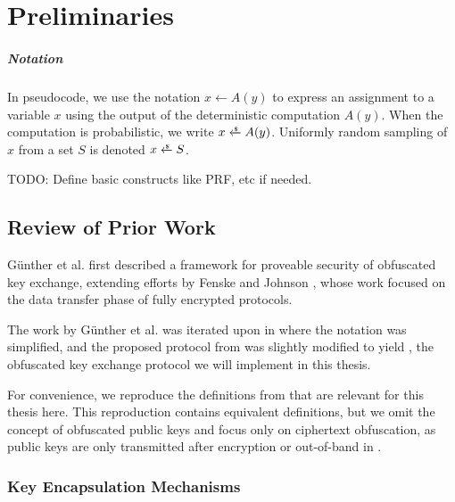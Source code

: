 \chapter{Preliminaries}\label{ch:preliminaries}

\paragraph{Notation}
In pseudocode, we use the notation $x \gets A(y)$ to express an assignment to a variable $x$ using the output of the deterministic computation $A(y)$. When the computation is probabilistic, we write $x \getsr A(y)$.
Uniformly random sampling of $x$ from a set $S$ is denoted $x \getsr S$.

TODO: Define basic constructs like PRF, etc if needed.

\section{Review of Prior Work} \label{sec:review-gsv24}

Günther et al. first \cite{CCS:GunSteVei24} described a framework for proveable security of obfuscated key exchange, extending efforts by Fenske and Johnson \cite{CCS:FenJoh24}, whose work focused on the data transfer phase of fully encrypted protocols.

The work by Günther et al. was iterated upon in \cite{EPRINT:GRSV25} where the notation was simplified, and the proposed protocol from \cite{CCS:GunSteVei24} was slightly modified to yield \drivel, the obfuscated key exchange protocol we will implement in this thesis.

For convenience, we reproduce the definitions from \cite{CCS:GunSteVei24,EPRINT:GRSV25} that are relevant for this thesis here. This reproduction contains equivalent definitions, but we omit the concept of obfuscated public keys and focus only on ciphertext obfuscation, as public keys are only transmitted after encryption or out-of-band in \drivel.

\subsection{Key Encapsulation Mechanisms}

